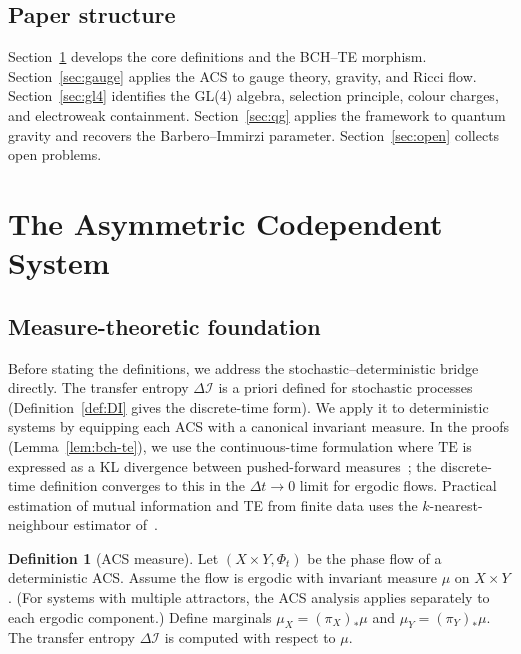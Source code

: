 \documentclass[11pt,a4paper]{article}
\theoremstyle{plain}
\theoremstyle{definition}
\newtheorem{definition}[theorem]{Definition}
\theoremstyle{remark}
\newcommand{\DI}{\Delta\mathcal{I}}
\newcommand{\TE}{\mathrm{TE}}
\begin{document}
\subsection{Paper structure}
Section~\ref{sec:acs} develops the core definitions and the BCH--TE morphism.
Section~\ref{sec:gauge} applies the ACS to gauge theory, gravity, and Ricci flow.
Section~\ref{sec:gl4} identifies the GL(4) algebra, selection principle, colour charges,
and electroweak containment.
Section~\ref{sec:qg} applies the framework to quantum gravity and recovers
the Barbero--Immirzi parameter.
Section~\ref{sec:open} collects open problems.
\section{The Asymmetric Codependent System}
\label{sec:acs}

\subsection{Measure-theoretic foundation}

Before stating the definitions, we address the stochastic--deterministic
bridge directly.  The transfer entropy $\DI$ is a priori defined for stochastic
processes (Definition~\ref{def:DI} gives the discrete-time form).
We apply it to deterministic systems by equipping each ACS with a
canonical invariant measure.  In the proofs (Lemma~\ref{lem:bch-te}),
we use the continuous-time formulation where $\TE$ is expressed as a
KL divergence between pushed-forward measures~\cite{Schreiber2000,Bossomaier2016};
the discrete-time definition converges to this in the $\Delta t \to 0$ limit
for ergodic flows.  Practical estimation of mutual information and TE
from finite data uses the $k$-nearest-neighbour estimator of~\cite{Kraskov2004}.

\begin{definition}[ACS measure]\label{def:acs-measure}
Let $(X \times Y, \Phi_t)$ be the phase flow of a deterministic ACS.
Assume the flow is ergodic with invariant measure $\mu$ on $X \times Y$.
(For systems with multiple attractors, the ACS analysis applies
separately to each ergodic component.)
Define marginals $\mu_X = (\pi_X)_*\mu$ and $\mu_Y = (\pi_Y)_*\mu$.
The transfer entropy $\DI$ is computed with respect to $\mu$.
\end{definition}
\end{document}
